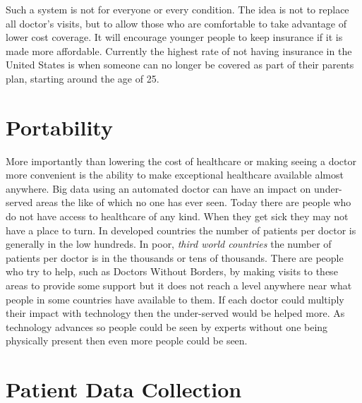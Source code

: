 \documentclass[sigconf]{acmart}
\begin{document}
Such a system is not for everyone or every condition.  The idea is not 
to replace all doctor's visits, but to allow those who are comfortable 
to take advantage of lower cost coverage.  It will encourage younger 
people to keep insurance if it is made more affordable.  Currently the 
highest rate of not having insurance in the United States is when 
someone can no longer be covered as part of their parents plan, starting 
around the age of 25\cite{Census}. 

\section{Portability}
More importantly than lowering the cost of healthcare or making seeing 
a doctor more convenient is the ability to make exceptional healthcare 
available almost anywhere.  Big data using an automated doctor can have 
an impact on under-served areas the like of which no one has ever seen.  
Today there are people who do not have access to healthcare of any kind.  
When they get sick they may not have a place to turn.  In developed 
countries the number of patients per doctor is generally in the low 
hundreds.  In poor, \emph{third world countries} the number of patients 
per doctor is in the thousands or tens of thousands\cite{BigThink}.  
There are people who try to help, such as Doctors Without Borders, by 
making visits to these areas to provide some support but it does not 
reach a level anywhere near what people in some countries have available 
to them.  If each doctor could multiply their impact with technology 
then the under-served would be helped more.  As technology advances so 
people could be seen by experts without one being physically present 
then even more people could be seen.

\section{Patient Data Collection}
\end{document}
